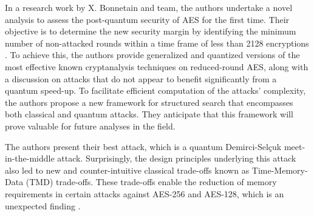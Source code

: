  
In a research work by X. Bonnetain and team, the authors undertake a novel analysis to assess the post-quantum security of AES for the first time. Their objective is to determine the new security margin by identifying the minimum number of non-attacked rounds within a time frame of less than 2128 encryptions \cite{chen2016postquantum}\cite{mohammad2015innovative}. To achieve this, the authors provide generalized and quantized versions of the most effective known cryptanalysis techniques on reduced-round AES, along with a discussion on attacks that do not appear to benefit significantly from a quantum speed-up. To facilitate efficient computation of the attacks' complexity, the authors propose a new framework for structured search that encompasses both classical and quantum attacks. They anticipate that this framework will prove valuable for future analyses in the field. 


The authors present their best attack, which is a quantum Demirci-Selçuk meet-in-the-middle attack. Surprisingly, the design principles underlying this attack also led to new and counter-intuitive classical trade-offs known as Time-Memory-Data (TMD) trade-offs. These trade-offs enable the reduction of memory requirements in certain attacks against AES-256 and AES-128, which is an unexpected finding \cite{sharma2023post}.